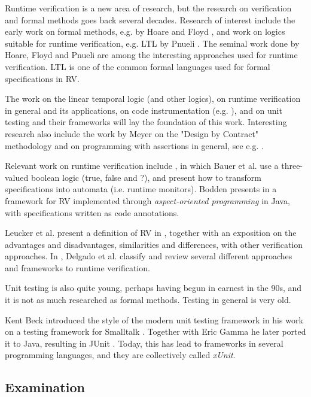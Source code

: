 \documentclass[a4paper,11pt]{article}
\begin{document}
Runtime verification is a new area of research, but the research on verification and formal methods goes back several decades. Research of interest include the early work on formal methods, e.g. by Hoare \cite{hoare69} and Floyd \cite{floyd67}, and work on logics suitable for runtime verification, e.g. LTL by Pnueli \cite{pnueli77}. The seminal work done by Hoare, Floyd and Pnueli are among the interesting approaches used for runtime verification. LTL is one of the common formal languages used for formal specifications in RV.

The work on the linear temporal logic (and other logics), on runtime verification in general and its applications, on code instrumentation (e.g. \cite{aspectj,matusiak09}), and on unit testing and their frameworks will lay the foundation of this work. Interesting research also include the work by Meyer on the "Design by Contract" methodology \cite{meyer92} and on programming with assertions in general, see e.g. \cite{rosenblum95,bartetzko01}.

Relevant work on runtime verification include \cite{bauer06}, in which Bauer et al. use a three-valued boolean logic (true, false and ?), and present how to transform specifications into automata (i.e. runtime monitors). Bodden presents in \cite{bodden05} a framework for RV implemented through \emph{aspect-oriented programming} \cite{aspectj} in Java, with specifications written
as code annotations.

Leucker et al. present a definition of RV in \cite{leucker08}, together with an exposition on the advantages and disadvantages, similarities and differences, with other verification approaches. In \cite{delgado04}, Delgado et al. classify and review several different approaches and frameworks to runtime verification.

Unit testing is also quite young, perhaps having begun in earnest in the 90s, and it is not as much researched as formal methods. Testing in general is very old.

Kent Beck introduced the style of the modern unit testing framework in his
work on a testing framework  for Smalltalk \cite{beck-smalltalk-testing}. 
Together with Eric Gamma he later ported it to Java, resulting in JUnit \cite{junit}. Today, this has lead to frameworks in several programming languages, and they are collectively called \textit{xUnit}.

\subsection{Examination}
\end{document}

